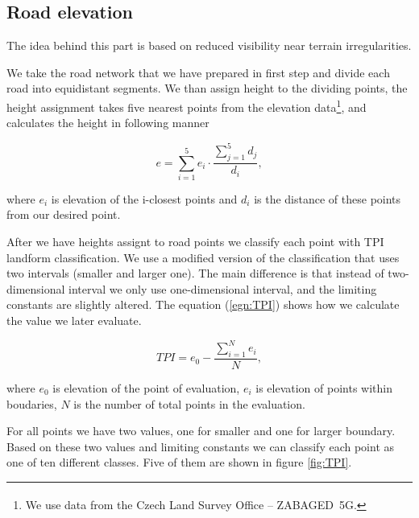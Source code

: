 \documentclass[oneside]{article}
\begin{document}
        \subsection{Road elevation}
        The idea behind this part is based on reduced visibility near terrain irregularities. 

        We take the road network that we have prepared in first step and divide each road into equidistant segments. We than assign height to the dividing points, the height assignment takes five nearest points from the elevation data\footnote{We use data from the Czech Land Survey Office -- ZABAGED\textsuperscript{\textregistered}\ 5G.}, and calculates the height in following manner

        \begin{equation}
            e=\sum_{i=1}^{5}e_{i}\cdot\frac{\sum_{j=1}^{5}d_{j}}{d_{i}},
        \end{equation}

        \noindent where $e_{i}$ is elevation of the i-closest points and $d_{i}$ is the distance of these points from our desired point.

        After we have heights assignt to road points we classify each point with TPI landform classification. We use a modified version of the classification that uses two intervals (smaller and larger one). The main difference is that instead of two-dimensional interval we only use one-dimensional interval, and the limiting constants are slightly altered. The equation (\ref{egn:TPI}) shows how we calculate the value we later evaluate.

        \begin{equation}
            TPI=e_{0}-\frac{\sum_{i=1}^{N}e_{i}}{N},
            \label{egn:TPI}
        \end{equation}

        \noindent where $e_{0}$ is elevation of the point of evaluation, $e_{i}$ is elevation of points within boudaries, $N$ is the number of total points in the evaluation.

        For all points we have two values, one for smaller and one for larger boundary. Based on these two values and limiting constants we can classify each point as one of ten different classes. Five of them are shown in figure \ref{fig:TPI}.
\end{document}
